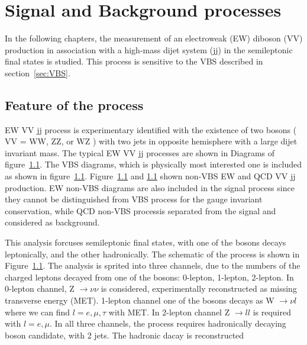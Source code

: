 \chapter{Signal and Background processes}
\label{chap:sigbkg}
In the following chapters, the measurement of an electroweak (EW) diboson (VV) production in association with a high-mass dijet system (jj) in the semileptonic final states is studied.
This process is sensitive to the VBS described in section~\ref{sec:VBS}.
\section{Feature of the process}
EW VV jj process is experimentary identified with the existence of two bosons ( VV = WW, ZZ, or WZ ) with two jets in opposite hemisphere with a large dijet invariant mass.
The typical EW VV jj processes are shown in Diagrams of figure~\ref{}.
The VBS diagrams, which is physically most interested one is included as shown in figure~\ref{}. Figure~\ref{} and \ref{} shown non-VBS EW and QCD VV jj production. EW non-VBS diagrams are also included in the signal process since they cannot be distinguished from VBS process for the gauge invariant conservation, while QCD non-VBS processis separated from the signal and considered as background.


This analysis forcuses semileptonic final states, with one of the bosons decays leptonically, and the other hadronically. 
The schematic of the process is shown in Figure~\ref{}.
The analysis is sprited into three channels, due to the numbers of the charged leptons decayed from one of the bosons: 0-lepton, 1-lepton, 2-lepton. 
In 0-lepton channel, Z $\rightarrow \nu \nu$ is considered, experimentally reconstructed as missing transverse energy (MET). 1-lepton channel one of the bosons decays as W $\rightarrow \nu l$ where we can find $l = e, \mu, \tau$ with MET. In 2-lepton channel Z $\rightarrow l l$ is required with $l = e, \mu$. 
In all three channels, the process requires hadronically decaying boson candidate, with 2 jets. The hadronic dacay is reconstructed  

